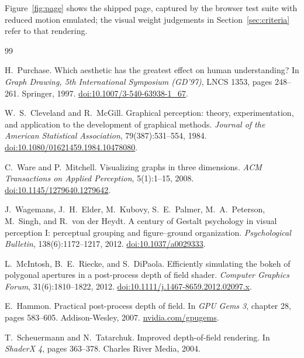 \documentclass[11pt,a4paper]{article}
\theoremstyle{definition}
\begin{document}
Figure~\ref{fig:page} shows the shipped page, captured by the browser test
suite with reduced motion emulated; the visual weight judgements in
Section~\ref{sec:criteria} refer to that rendering.

\begin{thebibliography}{99}

H.~Purchase.
\newblock Which aesthetic has the greatest effect on human understanding?
\newblock In \emph{Graph Drawing, 5th International Symposium (GD'97)},
LNCS 1353, pages 248--261. Springer, 1997.
\newblock \href{https://doi.org/10.1007/3-540-63938-1_67}{doi:10.1007/3-540-63938-1\_67}.

W.~S.~Cleveland and R.~McGill.
\newblock Graphical perception: theory, experimentation, and application to
  the development of graphical methods.
\newblock \emph{Journal of the American Statistical Association},
  79(387):531--554, 1984.
\newblock \href{https://doi.org/10.1080/01621459.1984.10478080}{doi:10.1080/01621459.1984.10478080}.

C.~Ware and P.~Mitchell.
\newblock Visualizing graphs in three dimensions.
\newblock \emph{ACM Transactions on Applied Perception}, 5(1):1--15, 2008.
\newblock \href{https://doi.org/10.1145/1279640.1279642}{doi:10.1145/1279640.1279642}.

J.~Wagemans, J.~H.~Elder, M.~Kubovy, S.~E.~Palmer, M.~A.~Peterson,
  M.~Singh, and R.~von der Heydt.
\newblock A century of Gestalt psychology in visual perception I: perceptual
  grouping and figure--ground organization.
\newblock \emph{Psychological Bulletin}, 138(6):1172--1217, 2012.
\newblock \href{https://doi.org/10.1037/a0029333}{doi:10.1037/a0029333}.

L.~McIntosh, B.~E.~Riecke, and S.~DiPaola.
\newblock Efficiently simulating the bokeh of polygonal apertures in a
  post-process depth of field shader.
\newblock \emph{Computer Graphics Forum}, 31(6):1810--1822, 2012.
\newblock \href{https://doi.org/10.1111/j.1467-8659.2012.02097.x}{doi:10.1111/j.1467-8659.2012.02097.x}.

E.~Hammon.
\newblock Practical post-process depth of field.
\newblock In \emph{GPU Gems 3}, chapter 28, pages 583--605.
  Addison-Wesley, 2007.
\newblock \href{https://developer.nvidia.com/gpugems/gpugems3/part-iv-image-effects/chapter-28-practical-post-process-depth-field}{nvidia.com/gpugems}.

T.~Scheuermann and N.~Tatarchuk.
\newblock Improved depth-of-field rendering.
\newblock In \emph{ShaderX 4}, pages 363--378. Charles River Media, 2004.


\end{thebibliography}
\end{document}
